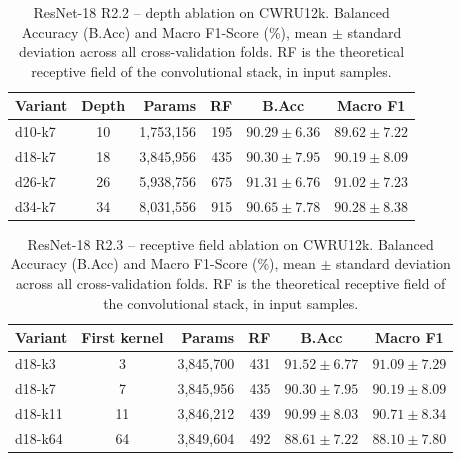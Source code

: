 \begin{table}[ht]
\centering
\caption{ResNet-18 R2.2 -- depth ablation on CWRU12k. Balanced Accuracy (B.Acc) and Macro F1-Score (\%), mean $\pm$ standard deviation across all cross-validation folds. RF is the theoretical receptive field of the convolutional stack, in input samples.}
\label{tab:ablation_resnet18_depth_cwru12k}
\begin{tabular}{@{}l c r r c c@{}}
\toprule
\textbf{Variant} & \textbf{Depth} & \textbf{Params} & \textbf{RF} & \textbf{B.Acc} & \textbf{Macro F1} \\ \midrule
d10-k7 & 10 & 1,753,156 & 195 & $90.29 \pm 6.36$ & $89.62 \pm 7.22$ \\
d18-k7 & 18 & 3,845,956 & 435 & $90.30 \pm 7.95$ & $90.19 \pm 8.09$ \\
d26-k7 & 26 & 5,938,756 & 675 & $91.31 \pm 6.76$ & $91.02 \pm 7.23$ \\
d34-k7 & 34 & 8,031,556 & 915 & $90.65 \pm 7.78$ & $90.28 \pm 8.38$ \\
\bottomrule
\end{tabular}
\end{table}

\begin{table}[ht]
\centering
\caption{ResNet-18 R2.3 -- receptive field ablation on CWRU12k. Balanced Accuracy (B.Acc) and Macro F1-Score (\%), mean $\pm$ standard deviation across all cross-validation folds. RF is the theoretical receptive field of the convolutional stack, in input samples.}
\label{tab:ablation_resnet18_kernel_cwru12k}
\begin{tabular}{@{}l c r r c c@{}}
\toprule
\textbf{Variant} & \textbf{First kernel} & \textbf{Params} & \textbf{RF} & \textbf{B.Acc} & \textbf{Macro F1} \\ \midrule
d18-k3 & 3 & 3,845,700 & 431 & $91.52 \pm 6.77$ & $91.09 \pm 7.29$ \\
d18-k7 & 7 & 3,845,956 & 435 & $90.30 \pm 7.95$ & $90.19 \pm 8.09$ \\
d18-k11 & 11 & 3,846,212 & 439 & $90.99 \pm 8.03$ & $90.71 \pm 8.34$ \\
d18-k64 & 64 & 3,849,604 & 492 & $88.61 \pm 7.22$ & $88.10 \pm 7.80$ \\
\bottomrule
\end{tabular}
\end{table}

